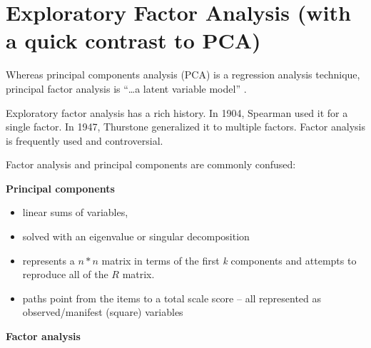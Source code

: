 \documentclass[
  english,
]{book}
\providecommand{\tightlist}{%
  \setlength{\itemsep}{0pt}\setlength{\parskip}{0pt}}
\begin{document}
\hypertarget{exploratory-factor-analysis-with-a-quick-contrast-to-pca}{%
\section{Exploratory Factor Analysis (with a quick contrast to PCA)}\label{exploratory-factor-analysis-with-a-quick-contrast-to-pca}}

Whereas principal components analysis (PCA) is a regression analysis technique, principal factor analysis is ``\ldots a latent variable model'' \citep{revelle_william_chapter_nodate}.

Exploratory factor analysis has a rich history. In 1904, Spearman used it for a single factor. In 1947, Thurstone generalized it to multiple factors. Factor analysis is frequently used and controversial.

Factor analysis and principal components are commonly confused:

\textbf{Principal components}

\begin{itemize}
\tightlist
\item
  linear sums of variables,
\item
  solved with an eigenvalue or singular decomposition
\item
  represents a \(n*n\) matrix in terms of the first \emph{k} components and attempts to reproduce all of the \(R\) matrix.
\item
  paths point from the items to a total scale score -- all represented as observed/manifest (square) variables
\end{itemize}

\textbf{Factor analysis}
\end{document}
